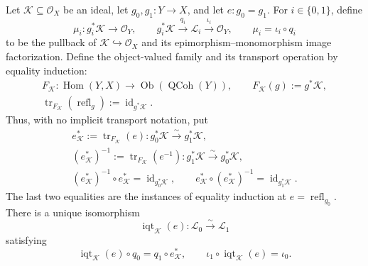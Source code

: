 \begin{lemma}
  \label{lemma:nagata-image-quotient-transport}
  \lean{}

  Let $\mathcal K\subseteq\mathcal O_X$ be an ideal, let
  $g_0,g_1\colon Y\to X$, and let $e\colon g_0=g_1$.  For $i\in\{0,1\}$,
  define
  \[
    \mu_i\colon g_i^*\mathcal K\to\mathcal O_Y,
    \qquad
    g_i^*\mathcal K\xrightarrow{q_i}\mathcal L_i
      \xrightarrow{\iota_i}\mathcal O_Y,
    \qquad
    \mu_i=\iota_i\circ q_i                              \tag{IQ0}
  \]
  to be the pullback of $\mathcal K\hookrightarrow\mathcal O_X$ and its
  epimorphism--monomorphism image factorization.  Define the object-valued
  family and its transport operation by equality induction:
  \[
  \begin{gathered}
    F_{\mathcal K}\colon\operatorname{Hom}(Y,X)
      \longrightarrow\operatorname{Ob}(\operatorname{QCoh}(Y)),
    \qquad F_{\mathcal K}(g):=g^*\mathcal K,\\
    \operatorname{tr}_{F_{\mathcal K}}
      (\operatorname{refl}_g)
      :=\operatorname{id}_{g^*\mathcal K}.
  \end{gathered}                                                    \tag{IQ0a}
  \]
  Thus, with no implicit transport notation, put
  \[
  \begin{gathered}
    e_{\mathcal K}^*
      :=\operatorname{tr}_{F_{\mathcal K}}(e)
      \colon g_0^*\mathcal K\xrightarrow{\sim}g_1^*\mathcal K,\\
    (e_{\mathcal K}^*)^{-1}
      :=\operatorname{tr}_{F_{\mathcal K}}(e^{-1})
      \colon g_1^*\mathcal K\xrightarrow{\sim}g_0^*\mathcal K,\\
    (e_{\mathcal K}^*)^{-1}\circ e_{\mathcal K}^*
      =\operatorname{id}_{g_0^*\mathcal K},
    \qquad
    e_{\mathcal K}^*\circ(e_{\mathcal K}^*)^{-1}
      =\operatorname{id}_{g_1^*\mathcal K}.
  \end{gathered}                                                    \tag{IQ0b}
  \]
  The last two equalities are the instances of equality induction at
  $e=\operatorname{refl}_{g_0}$.  There is a unique isomorphism
  \[
    \operatorname{iqt}_{\mathcal K}(e)\colon
      \mathcal L_0\xrightarrow{\sim}\mathcal L_1             \tag{IQ1}
  \]
  satisfying
  \[
    \operatorname{iqt}_{\mathcal K}(e)\circ q_0
      =q_1\circ e_{\mathcal K}^*,
    \qquad
    \iota_1\circ\operatorname{iqt}_{\mathcal K}(e)=\iota_0. \tag{IQ2}
  \]
\end{lemma}

